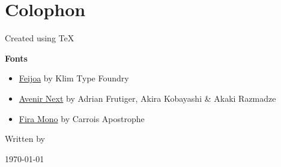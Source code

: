 \newpage
{}

\section*{Colophon}

Created using \TeX

\par\bigskip

\textbf{Fonts}

\begin{itemize}[leftmargin=*]
    \item \href{https://klim.co.nz/retail-fonts/feijoa/}{Feijoa} by Klim Type Foundry
    \item \href{https://www.linotype.com/90672/avenir-next-family.html}{Avenir Next} by Adrian Frutiger, Akira Kobayashi \& Akaki Razmadze
    \item \href{https://fonts.google.com/specimen/Fira+Mono}{Fira Mono} by Carrois Apostrophe
\end{itemize}


\vspace*{\fill}

\begin{center}
    Written by \instructor

    \hr

    \small{\today}
\end{center}
